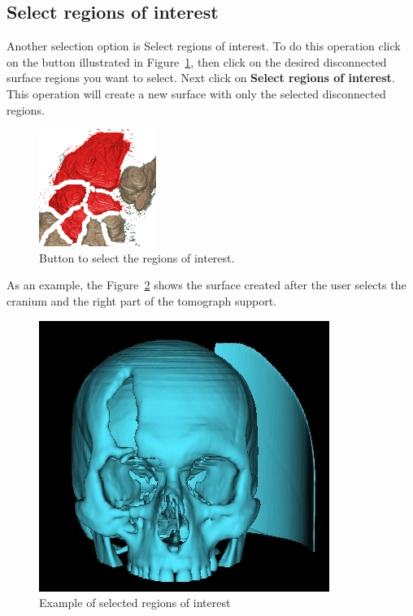 \newpage

\subsection{Select regions of interest}

Another selection option is Select regions of interest. To do this operation click on the button illustrated in Figure~\ref{fig:short_connectivity_manual}, then click on the desired disconnected surface regions you want to select. Next click on \textbf{Select regions of interest}. This operation will create a new surface with only the selected disconnected regions.

\begin{figure}[!htb]
\centering
\includegraphics[scale=0.2]{../user_guide_figures/icons/connectivity_manual.png}
\caption{Button to select the regions of interest.}
\label{fig:short_connectivity_manual}
\end{figure}

As an example, the Figure~\ref{fig:extract_most_region3} shows the surface created after the user selects the cranium and the right part of the tomograph support.

\begin{figure}[!htb]
\centering
\includegraphics[scale=0.35]{../user_guide_figures/invesalius_screen/surface_extract_most_region3.jpg}
\caption{Example of selected regions of interest}
\label{fig:extract_most_region3}
\end{figure}



